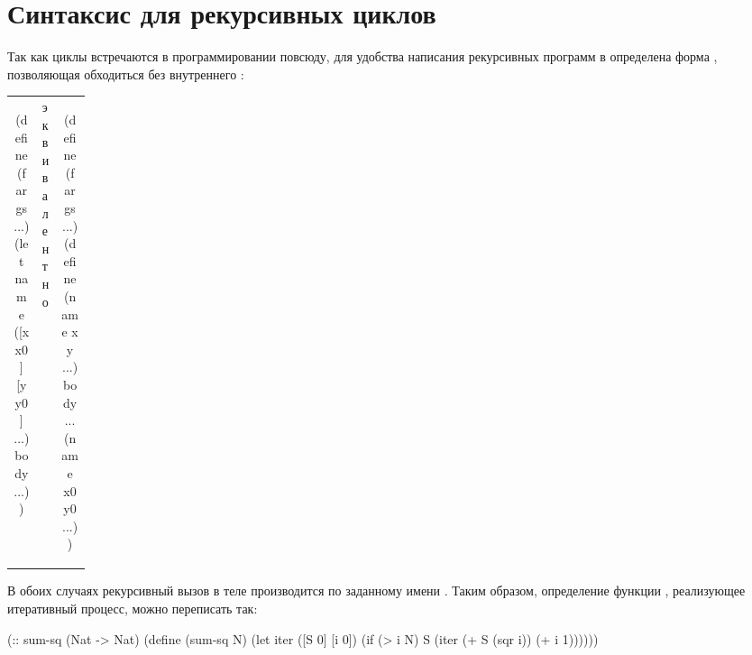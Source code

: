 \section[3]{Синтаксис для рекурсивных циклов}\label{named-let}%
Так как циклы встречаются в программировании повсюду, для удобства написания рекурсивных программ в \Scheme определена форма , позволяющая обходиться без внутреннего :

\begin{tabular}{cp{0.1\linewidth}c}
  \begin{minipage}{0.35\linewidth}
\begin{SchemeCode}[emph={name,x,y,x0,y0}]
(define (f args ...)
  (let name ([x x0] 
             [y y0] ...)
    body ...))
\end{SchemeCode}    
  \end{minipage} & эквива\-лентно &
  \begin{minipage}{0.35\linewidth}
\begin{SchemeCode}[emph={name,x,y,x0,y0}]
(define (f args ...)
  (define (name x y ...)
    body ...
  (name x0 y0 ...))
\end{SchemeCode}    
  \end{minipage}
\end{tabular}

В обоих случаях рекурсивный вызов в теле  производится по заданному имени .
Таким образом, определение функции , реализующее итеративный процесс, можно переписать так:
\begin{Definition}[emph={N,S,i}]
(:: sum-sq (Nat -> Nat)
 (define (sum-sq N)
   (let iter ([S 0] [i 0])
     (if (> i N)
         S
         (iter (+ S (sqr i)) (+ i 1))))))
\end{Definition}

